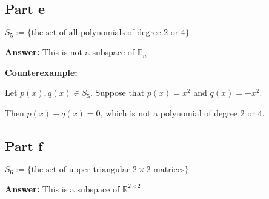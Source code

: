 \documentclass{article}
\begin{document}
\subsection*{Part e}
$S_{5} := \{\text{the set of all polynomials of degree 2 or 4}\}$

\textbf{Answer:} This is not a subspace of $\mathbb{P}_{n}$. %

\textbf{Counterexample:}


Let $p(x), q(x) \in S_{5}$.
Suppose that $p(x) = x^2$ and $q(x) = -x^2$.


Then $p(x) + q(x) = 0$, which is not a polynomial of degree 2 or 4.

\subsection*{Part f}
$S_{6} := \{\text{the set of upper triangular } 2 \times 2 \text{ matrices}\}$

\textbf{Answer:} This is a subspace of $\mathbb{R}^{2 \times 2}$.
\end{document}
